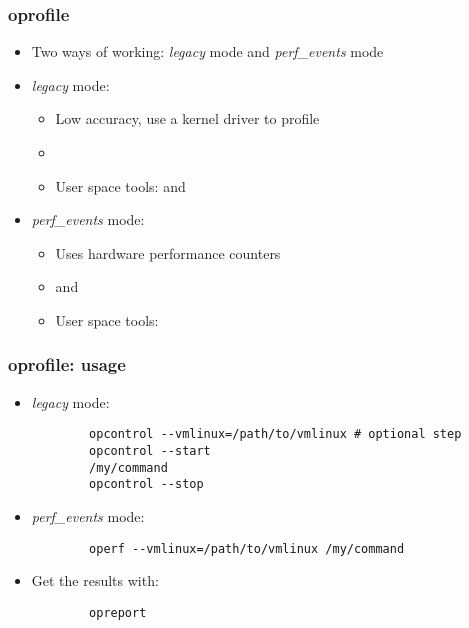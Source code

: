 \begin{frame}
\frametitle{oprofile}
\begin{itemize}
	\item Two ways of working: {\em legacy} mode and {\em
              perf\_events} mode
	\item {\em legacy} mode:
	\begin{itemize}
		\item Low accuracy, use a kernel driver to profile
		\item {}
		\item User space tools:  and 
	\end{itemize}
	\item {\em perf\_events} mode:
	\begin{itemize}
		\item Uses hardware performance counters
		\item {} and 
		\item User space tools: 
	\end{itemize}
\end{itemize}
\end{frame}

\begin{frame}[fragile]
\frametitle{oprofile: usage}
\begin{itemize}
	\item {\em legacy} mode:
	\begin{block}{}
	\begin{verbatim}
		opcontrol --vmlinux=/path/to/vmlinux # optional step
		opcontrol --start
		/my/command
		opcontrol --stop
	\end{verbatim}
	\end{block}
	\item {\em perf\_events} mode:
	\begin{block}{}
	\begin{verbatim}
		operf --vmlinux=/path/to/vmlinux /my/command
	\end{verbatim}
	\end{block}
	\item Get the results with:
	\begin{block}{}
	\begin{verbatim}
		opreport
	\end{verbatim}
	\end{block}
\end{itemize}
\end{frame}

